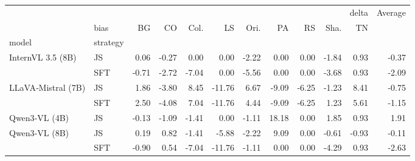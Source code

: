 \begin{tabular}{llrrrrrrrrrr}
\toprule
 &  & \multicolumn{9}{r}{delta} & Average \\
 & bias & BG & CO & Col. & LS & Ori. & PA & RS & Sha. & TN &  \\
model & strategy &  &  &  &  &  &  &  &  &  &  \\
\midrule
\multirow[t]{2}{*}{InternVL 3.5 (8B)} & JS & 0.06 & -0.27 & 0.00 & 0.00 & -2.22 & 0.00 & 0.00 & -1.84 & 0.93 & -0.37 \\
 & SFT & -0.71 & -2.72 & -7.04 & 0.00 & -5.56 & 0.00 & 0.00 & -3.68 & 0.93 & -2.09 \\
\cline{1-12}
\multirow[t]{2}{*}{LLaVA‑Mistral (7B)} & JS & 1.86 & -3.80 & 8.45 & -11.76 & 6.67 & -9.09 & -6.25 & -1.23 & 8.41 & -0.75 \\
 & SFT & 2.50 & -4.08 & 7.04 & -11.76 & 4.44 & -9.09 & -6.25 & 1.23 & 5.61 & -1.15 \\
\cline{1-12}
Qwen3‑VL (4B) & JS & -0.13 & -1.09 & -1.41 & 0.00 & -1.11 & 18.18 & 0.00 & 1.85 & 0.93 & 1.91 \\
\cline{1-12}
\multirow[t]{2}{*}{Qwen3‑VL (8B)} & JS & 0.19 & 0.82 & -1.41 & -5.88 & -2.22 & 9.09 & 0.00 & -0.61 & -0.93 & -0.11 \\
 & SFT & -0.90 & 0.54 & -7.04 & -11.76 & -1.11 & 0.00 & 0.00 & -4.29 & 0.93 & -2.63 \\
\cline{1-12}
\bottomrule
\end{tabular}
